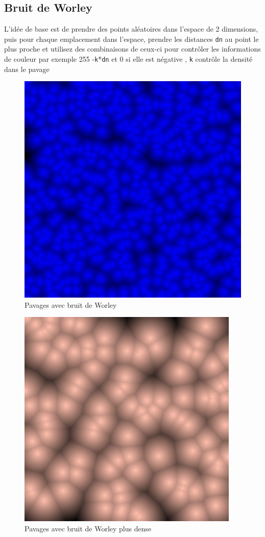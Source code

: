 \documentclass[a4paper,10pt]{article}
\begin{document}
\subsection{ Bruit de Worley }
L'idée de base est de prendre des points aléatoires dans l'espace de 2 dimensions, puis pour chaque emplacement dans l'espace, prendre les distances \texttt{dn} au point le plus proche et utilisez des combinaisons de ceux-ci pour contrôler les informations de couleur par exemple 255 -\texttt{k}*\texttt{dn} et 0 si elle est négative , \texttt{k} contrôle la densité dans le pavage \\
\begin{figure}[h]
\centering
  \includegraphics[scale=0.2]{voronoi2.png}
  \caption{Pavages avec bruit de Worley}
  \label{fig1}
\end{figure}
\begin{figure}[h]
\centering
  \includegraphics[scale=0.3]{voronoi3.png}
  \caption{Pavages avec bruit de Worley plus dense}
\end{figure}
\\
\end{document}
